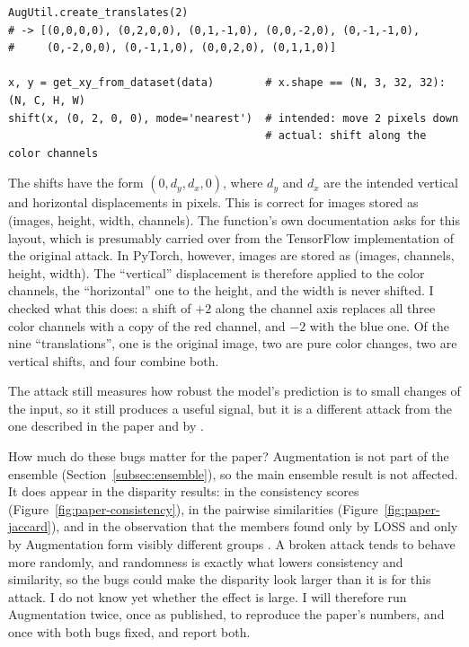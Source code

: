 \documentclass[a4paper]{article}
\begin{document}
\begin{lstlisting}
AugUtil.create_translates(2)
# -> [(0,0,0,0), (0,2,0,0), (0,1,-1,0), (0,0,-2,0), (0,-1,-1,0),
#     (0,-2,0,0), (0,-1,1,0), (0,0,2,0), (0,1,1,0)]

x, y = get_xy_from_dataset(data)        # x.shape == (N, 3, 32, 32): (N, C, H, W)
shift(x, (0, 2, 0, 0), mode='nearest')  # intended: move 2 pixels down
                                        # actual: shift along the color channels
\end{lstlisting}

The shifts have the form $(0, d_y, d_x, 0)$, where $d_y$ and $d_x$ are the intended vertical and horizontal displacements in pixels. This is correct for images stored as (images, height, width, channels).
The function's own documentation asks for this layout, which is presumably carried over from the TensorFlow implementation of the original attack.
In PyTorch, however, images are stored as (images, channels, height, width).
The ``vertical'' displacement is therefore applied to the color channels, the ``horizontal'' one to the height, and the width is never shifted.
I checked what this does: a shift of $+2$ along the channel axis replaces all three color channels with a copy of the red channel, and $-2$ with the blue one.
Of the nine ``translations'', one is the original image, two are pure color changes, two are vertical shifts, and four combine both.

The attack still measures how robust the model's prediction is to small changes of the input, so it still produces a useful signal, but it is a different attack from the one described in the paper and by \citet{choquette2021label}.

\begin{ownview}
How much do these bugs matter for the paper? Augmentation is not part of the ensemble (Section~\ref{subsec:ensemble}), so the main ensemble result is not affected.
It does appear in the disparity results: in the consistency scores (Figure~\ref{fig:paper-consistency}), in the pairwise similarities (Figure~\ref{fig:paper-jaccard}), and in the observation that the members found only by LOSS and only by Augmentation form visibly different groups \citep[Fig.~12]{wang2025mia}.
A broken attack tends to behave more randomly, and randomness is exactly what lowers consistency and similarity, so the bugs could make the disparity look larger than it is for this attack.
I do not know yet whether the effect is large. I will therefore run Augmentation twice, once as published, to reproduce the paper's numbers, and once with both bugs fixed, and report both.
\end{ownview}
\end{document}
